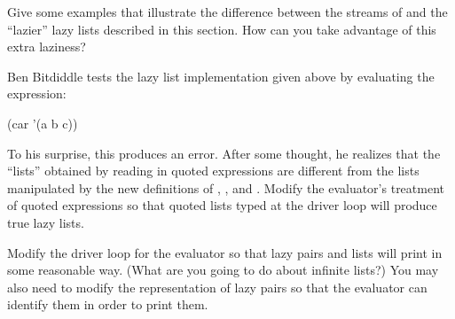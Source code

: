 \begin{exercise}
	\label{Exercise 4.32}
	Give some examples that illustrate the difference between the streams of  and the “lazier” lazy lists described in this section.
	How can you take advantage of this extra laziness?
\end{exercise}



\begin{exercise}
	\label{Exercise 4.33}
	Ben Bitdiddle tests the lazy list implementation given above by evaluating the expression:
	\begin{scheme}
	  (car '(a b c))
	\end{scheme}
	To his surprise, this produces an error.
	After some thought, he realizes that the “lists” obtained by reading in quoted expressions are different from the lists manipulated by the new definitions of , , and .
	Modify the evaluator’s treatment of quoted expressions so that quoted lists typed at the driver loop will produce true lazy lists.
\end{exercise}



\begin{exercise}
	\label{Exercise 4.34}
	Modify the driver loop for the evaluator so that lazy pairs and lists will print in some reasonable way.
	(What are you going to do about infinite lists?)
	You may also need to modify the representation of lazy pairs so that the evaluator can identify them in order to print them.
\end{exercise}
